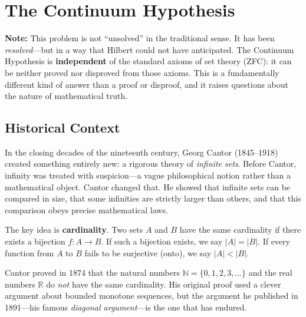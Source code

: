 
\chapter{The Continuum Hypothesis}

\begin{unsolvedbox}
\textbf{Note:} This problem is not ``unsolved'' in the traditional sense. It has been \emph{resolved}---but in a way that Hilbert could not have anticipated. The Continuum Hypothesis is \textbf{independent} of the standard axioms of set theory (ZFC): it can be neither proved nor disproved from those axioms. This is a fundamentally different kind of answer than a proof or disproof, and it raises questions about the nature of mathematical truth.
\end{unsolvedbox}

\section{Historical Context}

In the closing decades of the nineteenth century, Georg Cantor (1845--1918) created something entirely new: a rigorous theory of \emph{infinite sets}. Before Cantor, infinity was treated with suspicion---a vague philosophical notion rather than a mathematical object. Cantor changed that. He showed that infinite sets can be compared in size, that some infinities are strictly larger than others, and that this comparison obeys precise mathematical laws.

The key idea is \textbf{cardinality}. Two sets $A$ and $B$ have the same cardinality if there exists a bijection $f\colon A \to B$. If such a bijection exists, we say $|A| = |B|$. If every function from $A$ to $B$ fails to be surjective (onto), we say $|A| < |B|$.

Cantor proved in 1874 that the natural numbers $\mathbb{N} = \{0, 1, 2, 3, \ldots\}$ and the real numbers $\mathbb{R}$ do \emph{not} have the same cardinality. His original proof used a clever argument about bounded monotone sequences, but the argument he published in 1891---his famous \emph{diagonal argument}---is the one that has endured.

